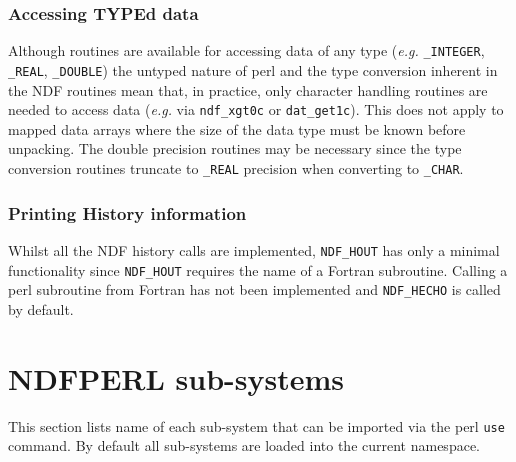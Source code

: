 \documentclass[twoside,11pt]{article}
\newcommand{\xlabel}[1]{}
\begin{document}
\subsubsection{Accessing TYPEd data}%

Although routines are available for accessing data of any type
(\emph{e.g.} \texttt{\_INTEGER}, \texttt{\_REAL}, \texttt{\_DOUBLE})
the untyped nature of perl and the type conversion inherent in the NDF
routines mean that, in practice, only character handling routines are
needed to access data (\emph{e.g.} via \texttt{ndf\_xgt0c} or
\texttt{dat\_get1c}).  This does not apply to mapped data arrays where
the size of the data type must be known before unpacking.  The double
precision routines may be necessary since the type conversion routines
truncate to \texttt{\_REAL} precision when converting to \texttt{\_CHAR}.

\subsubsection{Printing History information}%

Whilst all the NDF history calls are implemented, \texttt{NDF\_HOUT} has
only a minimal functionality since \texttt{NDF\_HOUT} requires the name of a
Fortran subroutine.  Calling a perl subroutine from Fortran has not been
implemented and \texttt{NDF\_HECHO} is called by default.

\appendix
\newpage
\section{\xlabel{ndfperl_sub-systems}NDFPERL sub-systems\label{subsys}}

This section lists name of each sub-system that can be imported via the 
perl \texttt{use} command. By default all sub-systems are loaded into the
current namespace.
\end{document}
